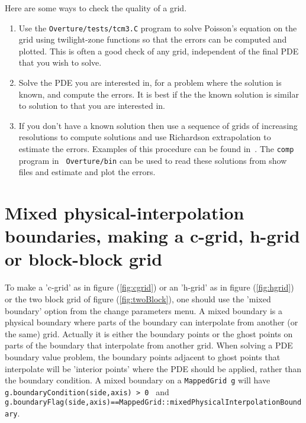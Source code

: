 \documentclass[xcolor=rgb,svgnames,dvipsnames]{article}
\begin{document}
\noindent Here are some ways to check the quality of a grid.
\begin{enumerate}
  \item Use the {\tt Overture/tests/tcm3.C} program to solve Poisson's equation
       on the grid using twilight-zone functions so that the errors can be
       computed and plotted. This is often a good check of any grid, independent
       of the final PDE that you wish to solve.
  \item Solve the PDE you are interested in, for a problem where the solution is
       known, and compute the errors.  It is best if the the known solution is
       similar to solution to that you are interested in.
  \item If you don't have a known solution then use a sequence of grids of
    increasing resolutions to compute solutions and use Richardson extrapolation
    to estimate the errors. Examples of this procedure can be found
    in~\cite{pog2008a,smog2012,fsi2012}. The {\tt comp} program in {\tt
    Overture/bin} can be used to read these solutions from show files and
    estimate and plot the errors.
\end{enumerate}


\clearpage
\section{Mixed physical-interpolation boundaries, making a c-grid, h-grid or block-block grid}

To make a 'c-grid' as in figure (\ref{fig:cgrid}) or an 'h-grid' as in figure (\ref{fig:hgrid})
or the two block grid of figure (\ref{fig:twoBlock}), 
one should use the 'mixed boundary' option from the change parameters menu.
A mixed boundary is a physical boundary where parts of the boundary can interpolate from another (or the
same) grid.
Actually it is either the boundary points or 
the ghost points on parts of the boundary that interpolate from another grid. 
When solving a PDE boundary value problem,
the boundary points adjacent to ghost points that interpolate will be 'interior points' where
the PDE should be applied, rather than the boundary condition.
A mixed boundary on a {\tt MappedGrid g} will have {\tt g.boundary\-Condition(side,axis) > 0 }
and {\tt g.boundary\-Flag(side,axis)\-==MappedGrid::\-mixed\-Physical\-Interpolation\-Boundary}.
\end{document}
